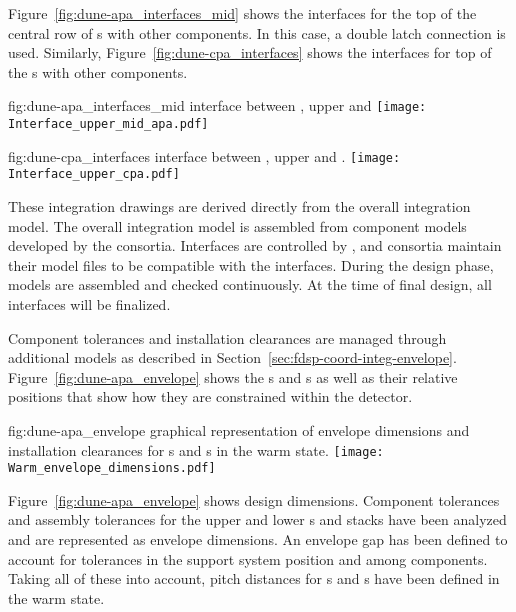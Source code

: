 Figure~\ref{fig:dune-apa_interfaces_mid} shows the interfaces for the
top of the central row of s with other components. In this case, a
double latch connection is used. Similarly,
Figure~\ref{fig:dune-cpa_interfaces} shows the interfaces for top of the
s with other components.
\begin{dunefigure}{fig:dune-apa_interfaces_mid}
  { interface between , upper  and }
  \texttt{[image: Interface\_upper\_mid\_apa.pdf]}
\end{dunefigure}
\begin{dunefigure}
    {fig:dune-cpa_interfaces}
  { interface between , upper  and .}
  \texttt{[image: Interface\_upper\_cpa.pdf]}
\end{dunefigure}

These integration drawings are derived directly from the overall
integration model. The overall integration model is assembled from
component models developed by the consortia. Interfaces are controlled
by , and consortia maintain their model files to be
compatible with the interfaces. During the design phase, models are
assembled and checked continuously. At the time of final design, all
interfaces will be finalized. %


Component tolerances and installation clearances are managed through
additional models as described in
Section~\ref{sec:fdsp-coord-integ-envelope}.
Figure~\ref{fig:dune-apa_envelope} shows the s and
s as well as their relative positions that show how they are
constrained within the detector.
\begin{dunefigure}{fig:dune-apa_envelope} { graphical
    representation of envelope dimensions and installation clearances
    for s and s in the warm state.}
  \texttt{[image: Warm\_envelope\_dimensions.pdf]}
\end{dunefigure}



Figure~\ref{fig:dune-apa_envelope} shows design dimensions. Component tolerances and assembly
tolerances for the upper and lower s and  stacks
have been analyzed and are represented as envelope dimensions. An envelope
gap has been defined to account for tolerances in the support system
position and among components. Taking all of these into account, pitch
distances for s and s have been defined in the
warm state.

